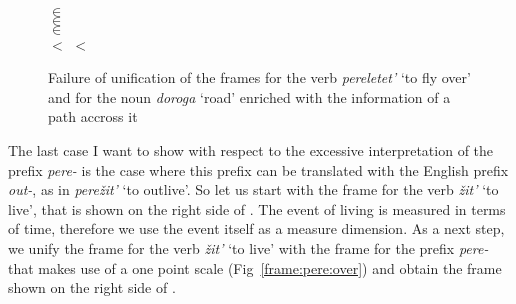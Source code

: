 \begin{figure}
\begin{minipage}{0.7\textwidth}
\end{minipage}
\begin{minipage}{0.25\textwidth}
\\
 $\in$ \\
 $\in$ \\
 $\in$ \\
 $<$  $<$ 
\end{minipage}
\caption{Failure of unification of the frames for the verb \textit{pereletet'} `to fly over' and for the noun \textit{doroga} `road' enriched with the information of a path accross it  \label{frame:pere:letet:road:red}}
\end{figure}

The last case I want to show with respect to the excessive interpretation of the prefix \textit{pere-} is the case where this prefix can be translated with the English prefix \textit{out-}, as in \textit{pere\v{z}it'} `to outlive'. So let us start with the frame for the verb \textit{\v{z}it'} `to live', that is shown on the right side of . The event of living is measured in terms of time, therefore we use the event itself as a measure dimension. As a next step, we unify the frame for the verb \textit{\v{z}it'} `to live' with the frame for the prefix \textit{pere-} that makes use of a one point scale (Fig~\ref{frame:pere:over}) and obtain the frame shown on the right side of .

